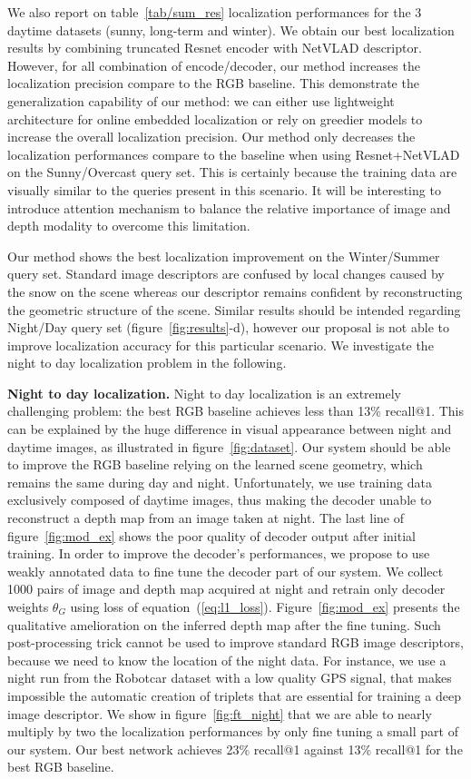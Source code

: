 We also report on table~\ref{tab/sum_res} localization performances for the 3 daytime datasets (sunny, long-term and winter). We obtain our best localization results by combining truncated Resnet encoder with NetVLAD descriptor. However, for all combination of encode/decoder, our method increases the localization precision compare to the RGB baseline. This demonstrate the generalization capability of our method: we can either use lightweight architecture for online embedded localization or rely on greedier models to increase the overall localization precision. Our method only decreases the localization performances compare to the baseline when using Resnet+NetVLAD on the Sunny/Overcast query set. This is certainly because the training data are visually similar to the queries present in this scenario. It will be interesting to introduce attention mechanism to balance the relative importance of image and depth modality to overcome this limitation.

Our method shows the best localization improvement on the Winter/Summer query set. Standard image descriptors are confused by local changes caused by the snow on the scene whereas our descriptor remains confident by reconstructing the geometric structure of the scene. Similar results should be intended regarding Night/Day query set (figure~\ref{fig:results}-d), however our proposal is not able to improve localization accuracy for this particular scenario. We investigate the night to day localization problem in the following.

\vspace{4pt}\noindent\textbf{Night to day localization.} Night to day localization is an extremely challenging problem: the best RGB baseline achieves less than 13\% recall@1. This can be explained by the huge difference in visual appearance between night and daytime images, as illustrated in figure~\ref{fig:dataset}. Our system should be able to improve the RGB baseline relying on the learned scene geometry, which remains the same during day and night. Unfortunately, we use training data exclusively composed of daytime images, thus making the decoder unable to reconstruct a depth map from an image taken at night. The last line of figure~\ref{fig:mod_ex} shows the poor quality of decoder output after initial training. In order to improve the decoder's performances, we propose to use weakly annotated data to fine tune the decoder part of our system. We collect 1000 pairs of image and depth map acquired at night and retrain only decoder weights $\theta_G$ using loss of equation~(\ref{eq:l1_loss}). Figure~\ref{fig:mod_ex} presents the qualitative amelioration on the inferred depth map after the fine tuning. Such post-processing trick cannot be used to improve standard RGB image descriptors, because we need to know the location of the night data. For instance, we use a night run from the Robotcar dataset with a low quality GPS signal, that makes impossible the automatic creation of triplets that are essential for training a deep image descriptor. We show in figure~\ref{fig:ft_night} that we are able to nearly multiply by two the localization performances by only fine tuning a small part of our system. Our best network achieves 23\% recall@1 against 13\% recall@1 for the best RGB baseline.

